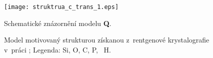 \documentclass[
digital, %
table,   %
nolof,     %
nolot,     %
oneside,
]{fithesis3}
\begin{document}
\begin{figure}\begin{center}\texttt{[image: struktrua\_c\_trans\_1.eps]}
\caption{Schematické znázornění modelu \textbf{Q}.}\label{schema_fosfat_cis}
\end{center}\end{figure}
\begin{figure}\begin{center}
\caption{Model motivovaný strukturou získanou z~rentgenové krystalografie v~práci \cite{C3NJ00721A};  Legenda:  Si,  O,  C,  P, ~H.}
\label{prehled_large}\end{center}
\end{figure}
\end{document}
